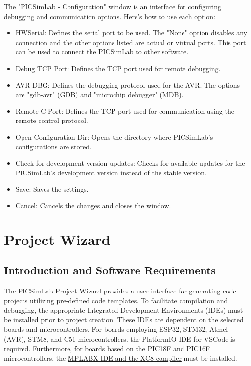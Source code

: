 The "PICSimLab - Configuration" window is an interface for configuring debugging and communication options.
Here's how to use each option:
\begin{itemize}
\item HWSerial: Defines the serial port to be used. The "None" option disables any connection and the 
other options listed are actual or virtual ports. This port can be used to connect the PICSimLab to other software.

\item Debug TCP Port: Defines the TCP port used for remote debugging.

\item AVR DBG: Defines the debugging protocol used for the AVR. The options are "gdb-avr" (GDB) and "microchip debugger" (MDB).

\item Remote C Port: Defines the TCP port used for communication using the remote control protocol.

\item Open Configuration Dir: Opens the directory where PICSimLab's configurations are stored.

\item Check for development version updates: Checks for available updates for the PICSimLab's development 
version instead of the stable version.

\item Save: Saves the settings.

\item Cancel: Cancels the changes and closes the window.
\end{itemize}


\section{Project Wizard}\hypertarget{def:prjwizard}{}

\subsection{Introduction and Software Requirements}

The PICSimLab Project Wizard provides a user interface for generating code projects
utilizing pre-defined code templates. To facilitate compilation and debugging,
the appropriate Integrated Development Environments (IDEs) must be installed prior
to project creation.  These IDEs are dependent on the selected boards and
microcontrollers.  For boards employing ESP32, STM32, Atmel (AVR), STM8, and C51
microcontrollers, 
the \href{https://platformio.org/install/ide?install=vscode}{PlatformIO IDE for VSCode}
is required.  Furthermore, for boards 
based on the PIC18F and PIC16F microcontrollers, 
the \hyperlink{def:installmplabx}{MPLABX IDE and the XC8 compiler}
must be installed.


